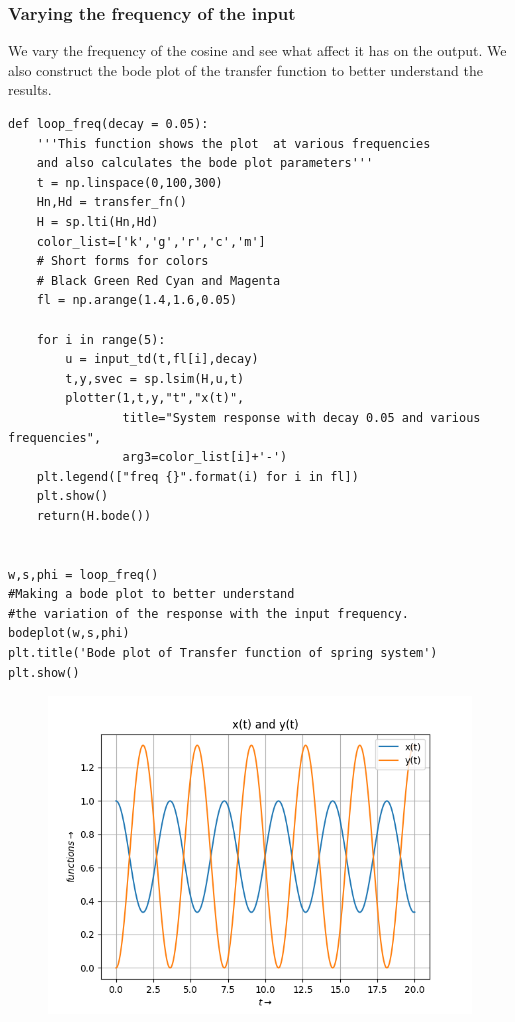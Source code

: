 \documentclass[11pt, a4paper]{article}
\begin{document}
\subsubsection{Varying the frequency of the input}
{
We vary the frequency of the cosine  and see what affect it has on the output.
We also construct the bode plot of the transfer function to better understand the results. 
}
\begin{verbatim}
def loop_freq(decay = 0.05):
    '''This function shows the plot  at various frequencies
    and also calculates the bode plot parameters'''
    t = np.linspace(0,100,300)
    Hn,Hd = transfer_fn()
    H = sp.lti(Hn,Hd)
    color_list=['k','g','r','c','m']
    # Short forms for colors
    # Black Green Red Cyan and Magenta
    fl = np.arange(1.4,1.6,0.05)
    
    for i in range(5):
        u = input_td(t,fl[i],decay)
        t,y,svec = sp.lsim(H,u,t)
        plotter(1,t,y,"t","x(t)",
                title="System response with decay 0.05 and various frequencies",
                arg3=color_list[i]+'-')
    plt.legend(["freq {}".format(i) for i in fl])
    plt.show()
    return(H.bode())


w,s,phi = loop_freq()
#Making a bode plot to better understand 
#the variation of the response with the input frequency.
bodeplot(w,s,phi)
plt.title('Bode plot of Transfer function of spring system')
plt.show()

\end{verbatim}
\begin{figure}[!tbh]
   	\centering
   	\includegraphics[scale=0.5]{Figure_3.png}
   	\label{fig:32}
   \end{figure}
\end{document}
